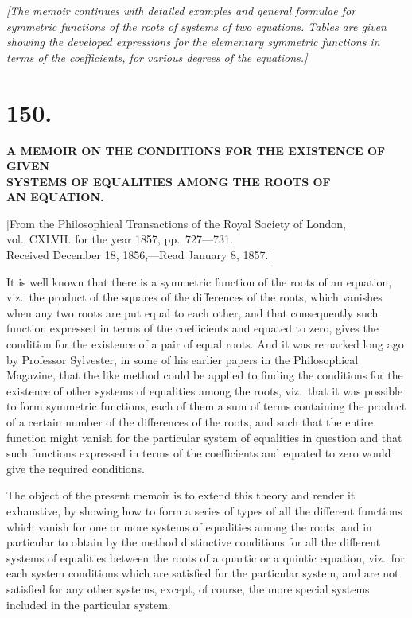 \documentclass[11pt,a4paper]{book}
\begin{document}
\begin{center}
\textit{[The memoir continues with detailed examples and general formulae for
symmetric functions of the roots of systems of two equations. Tables are given
showing the developed expressions for the elementary symmetric functions in
terms of the coefficients, for various degrees of the equations.]}

\newpage
\section*{150.}
\begin{center}
\Large\bfseries
A MEMOIR ON THE CONDITIONS FOR THE EXISTENCE OF GIVEN\\SYSTEMS OF EQUALITIES AMONG THE ROOTS OF\\AN EQUATION.
\end{center}

\begin{flushright}
\small
[From the Philosophical Transactions of the Royal Society of London,\\
vol.~CXLVII. for the year 1857, pp.~727---731.\\
Received December 18, 1856,---Read January 8, 1857.]
\end{flushright}

\normalsize

It is well known that there is a symmetric function of the roots of an
equation, viz.\ the product of the squares of the differences of the roots,
which vanishes when any two roots are put equal to each other, and that
consequently such function expressed in terms of the coefficients and equated
to zero, gives the condition for the existence of a pair of equal roots. And
it was remarked long ago by Professor Sylvester, in some of his earlier papers
in the Philosophical Magazine, that the like method could be applied to
finding the conditions for the existence of other systems of equalities among
the roots, viz.\ that it was possible to form symmetric functions, each of
them a sum of terms containing the product of a certain number of the
differences of the roots, and such that the entire function might vanish for
the particular system of equalities in question and that such functions
expressed in terms of the coefficients and equated to zero would give the
required conditions.

The object of the present memoir is to extend this theory and render it
exhaustive, by showing how to form a series of types of all the different
functions which vanish for one or more systems of equalities among the roots;
and in particular to obtain by the method distinctive conditions for all the
different systems of equalities between the roots of a quartic or a quintic
equation, viz.\ for each system conditions which are satisfied for the
particular system, and are not satisfied for any other systems, except, of
course, the more special systems included in the particular system.


\end{center}
\end{document}
